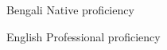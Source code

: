 
\begin{cvskills}

  \cvskill
    {Bengali}
    {Native proficiency}

  \cvskill
    {English}
    {Professional proficiency}
    
\end{cvskills}
